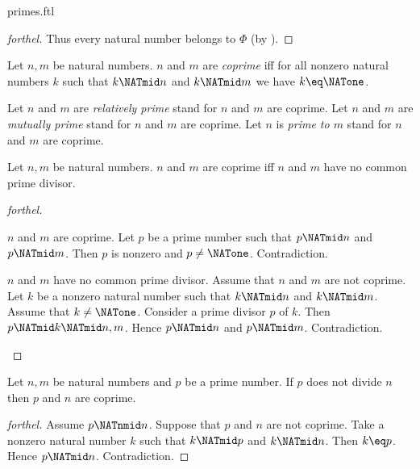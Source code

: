 \documentclass{naproche-library}
\begin{document}
\begin{smodule}[title=Prime Numbers]{primes.ftl}
\begin{proof}[forthel]
  Thus every natural number belongs to $\Phi$ (by ).
\end{proof}

\begin{definition}[forthel,id=ARITHMETIC_10_463197419077632]
  Let $n, m$ be natural numbers.
  $n$ and $m$ are \emph{coprime} iff for all nonzero natural numbers $k$ such that $k \NATmid n$ and $k \NATmid m$ we have $k \eq \NATone$.

  Let $n$ and $m$ are \emph{relatively prime} stand for $n$ and $m$ are coprime.
  Let $n$ and $m$ are \emph{mutually prime} stand for $n$ and $m$ are coprime.
  Let $n$ is \emph{prime to $m$} stand for $n$ and $m$ are coprime.
\end{definition}

\begin{proposition}[forthel,id=ARITHMETIC_10_5776394594287616]
  Let $n, m$ be natural numbers.
  $n$ and $m$ are coprime iff $n$ and $m$ have no common prime divisor.
\end{proposition}
\begin{proof}[forthel]
  \begin{case}{$n$ and $m$ are coprime.}
    Let $p$ be a prime number such that $p \NATmid n$ and $p \NATmid m$.
    Then $p$ is nonzero and $p \neq \NATone$.
    Contradiction.
  \end{case}

  \begin{case}{$n$ and $m$ have no common prime divisor.}
    Assume that $n$ and $m$ are not coprime.
    Let $k$ be a nonzero natural number such that $k \NATmid n$ and $k \NATmid m$.
    Assume that $k \neq \NATone$.
    Consider a prime divisor $p$ of $k$.
    Then $p \NATmid k \NATmid n,m$.
    Hence $p \NATmid n$ and $p \NATmid m$.
    Contradiction.
  \end{case}
\end{proof}

\begin{proposition}[forthel,id=ARITHMETIC_10_7212152851005440]
  Let $n, m$ be natural numbers and $p$ be a prime number.
  If $p$ does not divide $n$ then $p$ and $n$ are coprime.
\end{proposition}
\begin{proof}[forthel]
  Assume $p \NATnmid n$.
  Suppose that $p$ and $n$ are not coprime.
  Take a nonzero natural number $k$ such that $k \NATmid p$ and $k \NATmid n$.
  Then $k \eq p$.
  Hence $p \NATmid n$.
  Contradiction.
\end{proof}


\end{smodule}
\end{document}
